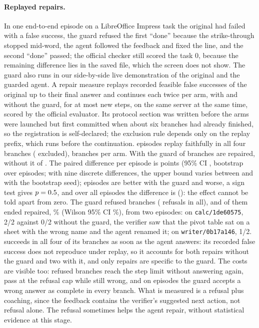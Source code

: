 \paragraph{Replayed repairs.} In one end-to-end episode on a LibreOffice Impress task the original had failed with a false success, the guard refused the first ``done'' because the strike-through stopped mid-word, the agent followed the feedback and fixed the line, and the second ``done'' passed; the official checker still scored the task 0, because the remaining difference lies in the saved file, which the screen does not show. The guard also runs in our side-by-side live demonstration of the original and the guarded agent. A repair measure replays \fgRepairEpisodes{} recorded feasible false successes of the original up to their final answer and continues each twice per arm, with and without the guard, for at most \fgRepMaxSteps{} new steps, on the same server at the same time, scored by the official evaluator. Its protocol section was written before the arms were launched but first committed when about six branches had already finished, so the registration is self-declared; the exclusion rule depends only on the replay prefix, which runs before the continuation. \fgRepEpisodes{} episodes replay faithfully in all four branches (\fgRepExcluded{} excluded), \fgRepBranches{} branches per arm. With the guard \fgRepRepairedGuard{} of \fgRepBranches{} branches are repaired, without it \fgRepRepairedNog{} of \fgRepBranches. The paired difference per episode is \fgRepDiff{} points (95\% CI \fgRepDiffCi, bootstrap over episodes; with nine discrete differences, the upper bound varies between \fgRepDiffHiMin{} and \fgRepDiffHiMax{} with the bootstrap seed); \fgRepBetter{} episodes are better with the guard and \fgRepWorse{} worse, a sign test gives $p=0.5$, and over all \fgRepEpisodesAll{} episodes the difference is \fgRepDiffAll{} (\fgRepDiffAllCi): the effect cannot be told apart from zero. The guard refused \fgRepRefused{} branches (\fgRepRefusals{} refusals in all), and \fgRepRefusedRepaired{} of them ended repaired, \fgRepRefusedRepairedPct\% (Wilson 95\% CI \fgRepRefusedRepairedCi\%), from two episodes: on \texttt{calc/1de60575}, 2/2 against 0/2 without the guard, the verifier saw that the pivot table sat on a sheet with the wrong name and the agent renamed it; on \texttt{writer/0b17a146}, 1/2. \texttt{\fgRepBothTask} succeeds in all four of its branches as soon as the agent answers: its recorded false success does not reproduce under replay, so it accounts for both repairs without the guard and two with it, and only \fgRepSpecific{} repairs are specific to the guard. The costs are visible too: \fgRepRefusedNoAnswer{} refused branches reach the step limit without answering again, \fgRepCapWrong{} pass at the refusal cap while still wrong, and on \fgRepWrongComplete{} episodes the guard accepts a wrong answer as complete in every branch. What is measured is a refusal plus coaching, since the feedback contains the verifier's suggested next action, not refusal alone. The refusal sometimes helps the agent repair, without statistical evidence at this stage. %